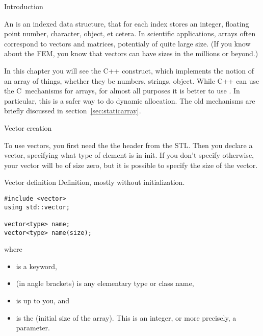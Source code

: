 
 {Introduction}

An  is an indexed data structure, that for each
index stores an integer, floating point number, character,
object, et cetera.
In scientific applications, arrays often correspond to vectors and
matrices, potentialy of quite large size. (If you know about the
\acf{FEM}, you know that vectors can have sizes in the millions or beyond.)

In this chapter you will see the C++  construct,
which implements the notion of an array of things, whether they be
numbers, strings, object.
While C++ can use the C~mechanisms for arrays, for almost all purposes
it is better to use . In particular, this is a safer way to
do dynamic allocation. The old
mechanisms are briefly discussed in section~\ref{sec:staticarray}.

 {Vector creation}

To use vectors, you first need the the  header from the
\ac{STL}. Then you declare a vector, specifying what type of element
is in init. If you don't specify otherwise, your vector will be of
size zero, but it is possible to specify the size of the vector.

\begin{block}{Vector definition}
  \label{sl:vector-def}
  Definition, mostly without initialization.
\begin{lstlisting}
#include <vector>
using std::vector;

vector<type> name;
vector<type> name(size);
\end{lstlisting}
where
\begin{itemize}
\item {} is a keyword,
\item {} (in angle brackets) is any elementary type or class
  name,
\item {} is up to you, and
\item {} is the (initial size of the array). This is an integer,
  or more precisely, a  parameter.
\end{itemize}
\end{block}

